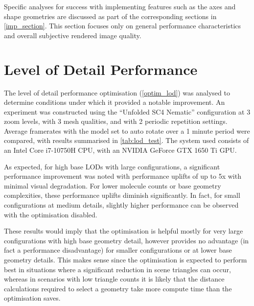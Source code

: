Specific analyses for success with implementing features such as the axes and shape geometries are discussed as part of the corresponding sections in \cref{imp_section}. This section focuses only on general performance characteristics and overall subjective rendered image quality.
\section{Level of Detail Performance}
\label{lod_analysis_section}

The level of detail performance optimisation (\cref{optim_lod}) was analysed to determine conditions under which it provided a notable improvement. An experiment was constructed using the ``Unfolded SC4 Nematic'' configuration at 3 zoom levels, with 3 mesh qualities, and with 2 periodic repetition settings. Average framerates with the model set to auto rotate over a 1 minute period were compared, with results summarised in \cref{tab:lod_test}. The system used consists of an Intel Core i7-10750H CPU, with an NVIDIA GeForce GTX 1650 Ti GPU.

As expected, for high base LODs with large configurations, a significant performance improvement was noted with performance uplifts of up to 5x with minimal visual degradation. For lower molecule counts or base geometry complexities, these performance uplifts diminish significantly. In fact, for small configurations at medium details, slightly higher performance can be observed with the optimisation disabled.

These results would imply that the optimisation is helpful mostly for very large configurations with high base geometry detail, however provides no advantage (in fact a performance disadvantage) for smaller configurations or at lower base geometry details. This makes sense since the optimisation is expected to perform best in situations where a significant reduction in scene triangles can occur, whereas in scenarios with low triangle counts it is likely that the distance calculations required to select a geometry take more compute time than the optimisation saves.

